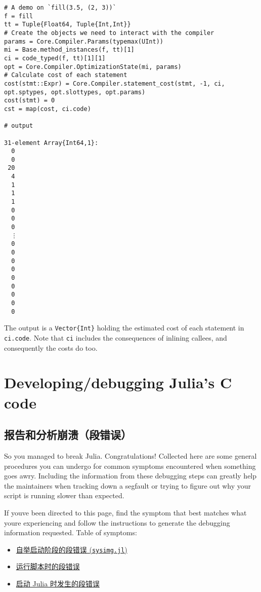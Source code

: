 \begin{verbatim}
# A demo on `fill(3.5, (2, 3))`
f = fill
tt = Tuple{Float64, Tuple{Int,Int}}
# Create the objects we need to interact with the compiler
params = Core.Compiler.Params(typemax(UInt))
mi = Base.method_instances(f, tt)[1]
ci = code_typed(f, tt)[1][1]
opt = Core.Compiler.OptimizationState(mi, params)
# Calculate cost of each statement
cost(stmt::Expr) = Core.Compiler.statement_cost(stmt, -1, ci, opt.sptypes, opt.slottypes, opt.params)
cost(stmt) = 0
cst = map(cost, ci.code)

# output

31-element Array{Int64,1}:
  0
  0
 20
  4
  1
  1
  1
  0
  0
  0
  ⋮
  0
  0
  0
  0
  0
  0
  0
  0
  0
\end{verbatim}



The output is a \texttt{Vector\{Int\}} holding the estimated cost of each statement in \texttt{ci.code}.  Note that \texttt{ci} includes the consequences of inlining callees, and consequently the costs do too.



\chapter{Developing/debugging Julia's C code}


\hypertarget{14100866936909376046}{}


\section{报告和分析崩溃（段错误）}



So you managed to break Julia.  Congratulations!  Collected here are some general procedures you can undergo for common symptoms encountered when something goes awry.  Including the information from these debugging steps can greatly help the maintainers when tracking down a segfault or trying to figure out why your script is running slower than expected.



If you{\textquotesingle}ve been directed to this page, find the symptom that best matches what you{\textquotesingle}re experiencing and follow the instructions to generate the debugging information requested.  Table of symptoms:



\begin{itemize}
\item \href{@ref}{自举启动阶段的段错误 (\texttt{sysimg.jl})}


\item \href{@ref}{运行脚本时的段错误}


\item \href{@ref}{启动 Julia 时发生的段错误}

\end{itemize}


